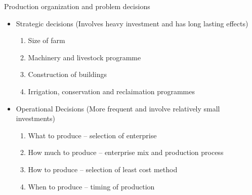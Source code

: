 \documentclass[12pt,ignorenonframetext,aspectratio=169]{beamer}
\providecommand{\tightlist}{%
  \setlength{\itemsep}{0pt}\setlength{\parskip}{0pt}}
\begin{document}
\begin{frame}{Production organization and problem decisions}
\protect\hypertarget{production-organization-and-problem-decisions}{}

\begin{block}{}

\begin{itemize}
\tightlist
\item
  Strategic decisions (Involves heavy investment and has long lasting
  effects)

  \begin{enumerate}
  \tightlist
  \item
    Size of farm
  \item
    Machinery and livestock programme
  \item
    Construction of buildings
  \item
    Irrigation, conservation and reclaimation programmes
  \end{enumerate}
\item
  Operational Decisions (More frequent and involve relatively small
  investments)

  \begin{enumerate}
  \tightlist
  \item
    What to produce -- selection of enterprise
  \item
    How much to produce -- enterprise mix and production process
  \item
    How to produce -- selection of least cost method
  \item
    When to produce -- timing of production
  \end{enumerate}
\end{itemize}

\end{block}

\end{frame}
\end{document}
